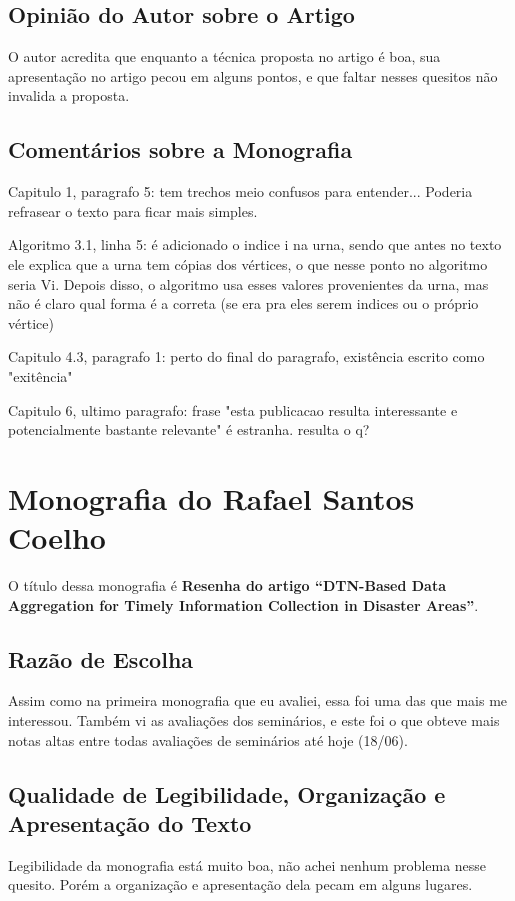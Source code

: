 \documentclass[a4paper,11pt]{article}
\begin{document}
\subsection{Opinião do Autor sobre o Artigo}
O autor acredita que enquanto a técnica proposta no artigo é boa, sua apresentação no artigo pecou 
em alguns pontos, e que faltar nesses quesitos não invalida a proposta. 

\subsection{Comentários sobre a Monografia}
Capitulo 1, paragrafo 5: tem trechos meio confusos para entender... Poderia refrasear o texto 
para ficar mais simples.

Algoritmo 3.1, linha 5: é adicionado o indice i na urna, sendo que antes no texto ele explica
que a urna tem cópias dos vértices, o que nesse ponto no algoritmo seria Vi.
Depois disso, o algoritmo usa esses valores provenientes da urna, mas não é claro
qual forma é a correta (se era pra eles serem indices ou o próprio vértice)

Capitulo 4.3, paragrafo 1: perto do final do paragrafo, existência escrito como "exitência"

Capitulo 6, ultimo paragrafo: frase "esta publicacao resulta interessante e potencialmente
bastante relevante" é estranha. resulta o q?


\pagebreak

\section{Monografia do Rafael Santos Coelho}
O título dessa monografia é \textbf{Resenha do artigo \textquotedblleft DTN-Based 
Data Aggregation for Timely Information Collection in Disaster Areas\textquotedblright }.

\subsection{Razão de Escolha}
Assim como na primeira monografia que eu avaliei, essa foi uma das que mais me interessou.
Também vi as avaliações dos seminários, e este foi o que obteve mais notas altas entre todas avaliações
de seminários até hoje (18/06).

\subsection{Qualidade de Legibilidade, Organização e Apresentação do Texto}
Legibilidade da monografia está muito boa, não achei nenhum problema nesse quesito. Porém
a organização e apresentação dela pecam em alguns lugares.
\end{document}
